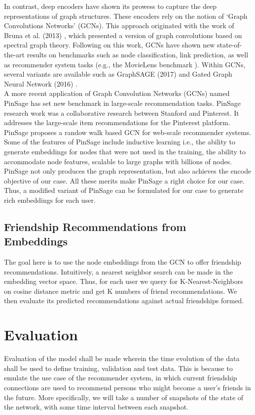 \documentclass{kththesis}
\begin{document}
In contrast, deep encoders have shown its prowess to capture the deep representations of graph structures. These encoders rely on the notion of `Graph Convolutions Networks' (GCNs). This approach originated with the work of Bruna et al. (2013) \cite{bruna}, which presented a version of graph convolutions based on spectral graph theory. Following on this work, GCNs have shown new state-of-the-art results on benchmarks such as node classification, link prediction, as well as recommender system tasks (e.g., the MovieLens benchmark \cite{mlens}). Within GCNs, several variants are available such as GraphSAGE (2017) \cite{gsage} and Gated Graph Neural Network (2016) \cite{gate}. \\

A more recent application of Graph Convolution Networks (GCNs) named PinSage \cite{PinSage} has set new benchmark in large-scale recommendation tasks. PinSage research work was a collaborative research between Stanford and Pinterest. It addresses the large-scale item recommendations for the Pinterest platform. PinSage proposes a randow walk based GCN for web-scale recommender systems. Some of the features of PinSage include inductive learning i.e., the ability to generate embeddings for nodes that were not used in the training, the ability to accommodate node features, scalable to large graphs with billions of nodes. PinSage not only produces the graph representation, but also achieves the encode objective of our case. All these merits make PinSage a right choice for our case. Thus, a modified variant of PinSage can be formulated for our case to generate rich embeddings for each user.\\

\subsection{Friendship Recommendations from Embeddings}
The goal here is to use the node embeddings from the GCN to offer friendship recommendations. Intuitively, a nearest neighbor search can be made in the embedding vector space. Thus, for each user we query for K-Nearest-Neighbors on cosine distance metric and get K numbers of friend recommendations. We then evaluate its predicted recommendations against actual friendships formed.
\section{Evaluation}
Evaluation of the model shall be made wherein the time evolution of the data shall be used to define training, validation and test data. This is because to emulate the use case of the recommender system, in which current friendship connections are used to recommend persons who might become a user's friends in the future. More specifically, we will take a number of snapshots of the state of the network, with some time interval between each snapshot. \\
\end{document}
